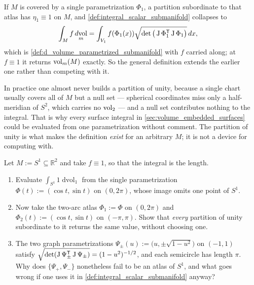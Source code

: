 \begin{remark}
\label{rem:one_chart_recovers_the_earlier_definition}
If $M$ is covered by a single parametrization $\Phi_1$, a partition subordinate to that atlas
has $\eta_1 \equiv 1$ on $M$, and \cref{def:integral_scalar_submanifold} collapses to
\[\int_M f \mathop{d\text{vol}}_m
  = \int_{V_1} f(\Phi_1(x))\sqrt{\det\big(\operatorname{J}\Phi_1^{\mathsf{T}}\operatorname{J}\Phi_1\big)}\,dx ,\]
which is \cref{def:d_volume_parametrized_submanifold} with $f$ carried along; at $f \equiv 1$ it
returns $\operatorname{vol}_m(M)$ exactly. So the general definition extends the earlier one rather than
competing with it.

In practice one almost never builds a partition of unity, because a single chart usually covers
all of $M$ but a null set --- spherical coordinates miss only a half-meridian of $S^2$, which
carries no $\operatorname{vol}_2$ --- and a null set contributes nothing to the integral. That is why every
surface integral in \cref{sec:volume_embedded_surfaces} could be evaluated from one
parametrization without comment. The partition of unity is what makes the definition \emph{exist}
for an arbitrary $M$; it is not a device for computing with.
\end{remark}

\begin{aiexercise}
\label{ex:ai_circle_two_atlases}
Let $M := S^1 \subseteq \mathbb{R}^2$ and take $f \equiv 1$, so that the integral is the length.
\begin{enumerate}[label=\textbf{(\alph*)}]
  \item Evaluate $\int_{S^1} 1 \mathop{d\text{vol}}_1$ from the single parametrization
    $\Phi(t) := (\cos t,\sin t)$ on $(0,2\pi)$, whose image omits one point of $S^1$.
  \item Now take the two-arc atlas $\Phi_1 := \Phi$ on $(0,2\pi)$ and $\Phi_2(t) :=
    (\cos t,\sin t)$ on $(-\pi,\pi)$. Show that \emph{every} partition of unity subordinate to it
    returns the same value, without choosing one.
  \item The two graph parametrizations $\Psi_\pm(u) := \big(u,\pm\sqrt{1-u^2}\big)$ on $(-1,1)$
    satisfy $\sqrt{\det(\operatorname{J}\Psi_\pm^{\mathsf{T}}\operatorname{J}\Psi_\pm)} = (1-u^2)^{-1/2}$, and each semicircle
    has length $\pi$. Why does $\{\Psi_+,\Psi_-\}$ nonetheless fail to be an atlas of $S^1$, and
    what goes wrong if one uses it in \cref{def:integral_scalar_submanifold} anyway?
\end{enumerate}
\end{aiexercise}

